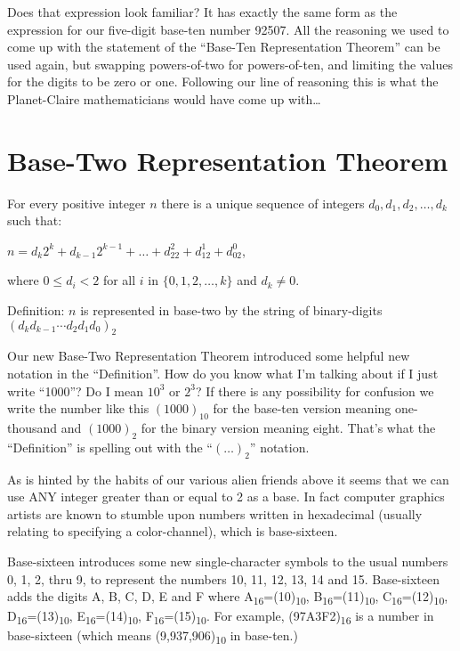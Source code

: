 \documentclass{article}
\newenvironment{jprIn}{\begin{adjustwidth}{2em}{}}{\end{adjustwidth}}
\begin{document}
Does that expression look familiar? It has exactly the same form
as the expression for our five-digit base-ten number 92507.
All the reasoning we used to come up with the statement of the ``Base-Ten
Representation Theorem'' can be used again, but swapping powers-of-two
for powers-of-ten, and limiting the values for the digits
to be zero or one.
Following our line of reasoning this is what the Planet-Claire mathematicians would have
come up with\dots

\section*{Base-Two Representation Theorem}
\begin{jprIn}
For every positive integer $n$ there is a unique
sequence of integers $d_0, d_1, d_2,\dots{},d_k$ such that:

\hspace{3em}$n=d_k2^k+d_{k-1}2^{k-1}+\dots+d_22^2+d_12^1+d_02^0$,

where $0\le{}d_i<2$ for all $i$ in $\{0,1,2,\dots{},k\}$ and $d_k\ne0$.

Definition: $n$ is represented in base-two by the string
of binary-digits $(d_kd_{k-1}{\cdots}d_2d_1d_0)_2$
\end{jprIn}
\bigskip

Our new Base-Two Representation Theorem introduced some helpful new notation in the ``Definition''.
How do you know what I'm talking about if I just
write ``1000''? Do I mean $10^3$ or $2^3$?
If there is any possibility for confusion we write
the number like this $(1000)_{10}$ 
for the base-ten version meaning one-thousand and $(1000)_2$
for the binary version meaning eight.
That's what the ``Definition'' is spelling out with the ``$(\dots)_2$'' notation.

As is hinted by the habits of our various alien friends
above it seems that we can use ANY integer greater than
or equal to 2 as a base.
In fact computer graphics artists are known
to stumble upon numbers written in hexadecimal (usually relating to specifying a color-channel),
which is base-sixteen.

Base-sixteen introduces some new single-character symbols to the usual numbers 0, 1,
2, thru 9,
to represent the numbers 10, 11, 12, 13, 14 and 15.
Base-sixteen adds the digits A, B, C, D, E and F where
A\textsubscript{16}=(10)\textsubscript{10},
B\textsubscript{16}=(11)\textsubscript{10},
C\textsubscript{16}=(12)\textsubscript{10},
D\textsubscript{16}=(13)\textsubscript{10},
E\textsubscript{16}=(14)\textsubscript{10},
F\textsubscript{16}=(15)\textsubscript{10}.
For example, (97A3F2)\textsubscript{16} is a number in base-sixteen
(which means (9,937,906)\textsubscript{10} in base-ten.)
\end{document}
